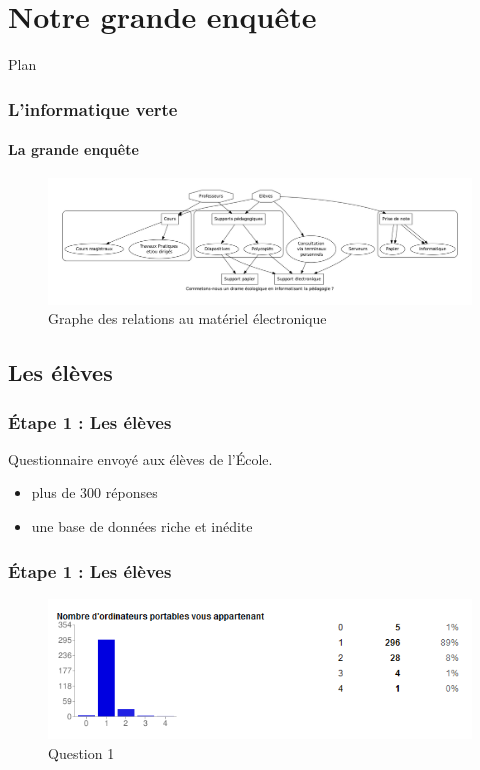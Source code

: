 \documentclass[slidetop,11pt]{beamer}
\begin{document}
\section{Notre grande enquête}
\begin{frame}{Plan}
  \tableofcontents[sections=\thesection]
\end{frame}

\begin{frame} 
  \frametitle{L'informatique verte}
  \framesubtitle{La grande enquête}
  \begin{figure}[h!]
  \includegraphics[width=\textwidth]{graphe.png}
  \caption{Graphe des relations au matériel électronique}
  \label{graphe}
  \end{figure}  
\end{frame}


\subsection{Les élèves}

\begin{frame}[label=pagesimple]
  \frametitle{\'Etape 1 : Les élèves}
  Questionnaire envoyé aux élèves de l'\'Ecole.
  \begin{itemize}[<+->]
    \item plus de 300 réponses
    \item une base de données riche et inédite
    \end{itemize}
  \bigskip
\end{frame}

\begin{frame} 
  \frametitle{\'Etape 1 : Les élèves}
  \begin{figure}[h!]
  \includegraphics[width=\textwidth]{i1.PNG}
  \caption{Question 1}
  \label{i1}
  \end{figure}
\end{frame}
\end{document}
